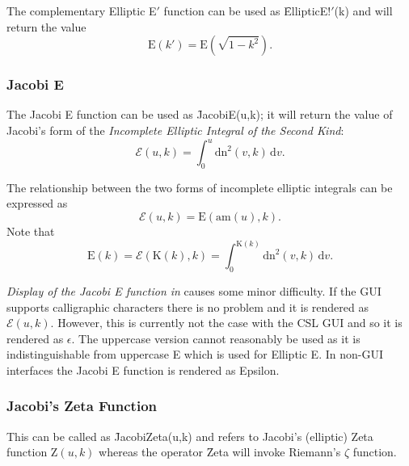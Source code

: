 The complementary Elliptic E$'$ function can be used as \f{EllipticE!$'$(k)}
and will return the value 
$$\mathrm{E}(k') = \mathrm{E}(\sqrt{1-k^2}).$$

\subsubsection{Jacobi E}
\hypertarget{operator:JacobiE}{}
The Jacobi E function can be used as  \f{JacobiE(u,k)};
it will return the value of Jacobi's form of
the \emph{Incomplete Elliptic Integral of the Second Kind}:
$$\mathcal{E}(u, k)=\int_0^u \mathrm{dn}^2 (v, k) \,\mathrm{d}v.$$ 

The relationship between the two forms of incomplete elliptic integrals can
be expressed as
$$\mathcal{E}(u, k) = \mathrm{E}(\mathrm{am}(u), k).$$
Note that
$$\mathrm{E}(k)=\mathcal{E}(\mathrm{K}(k), k)
=\int_0^{\mathrm{K}(k)} \mathrm{dn}^2(v, k) \,\mathrm{d}v.$$

\emph{Display of the Jacobi E function in \REDUCE} causes some minor difficulty. 
If the GUI supports calligraphic characters there is no problem and it is rendered
as $\mathcal{E}(u,k)$.
However, this is currently not the case with the CSL GUI and so it is rendered as $\epsilon$.
The uppercase version cannot reasonably be used as it is indistinguishable from uppercase E
which is used for Elliptic E.
In non-GUI interfaces the Jacobi E function is rendered as Epsilon.

%
%

\subsubsection{Jacobi's Zeta Function}
\hypertarget{operator:JacobiZeta}{}

This can be called as \f{JacobiZeta(u,k)} and refers to Jacobi's (elliptic)
Zeta function $\mathrm{Z}(u,k)$ whereas the operator \f{Zeta} will invoke
Riemann's $\zeta$ function.

